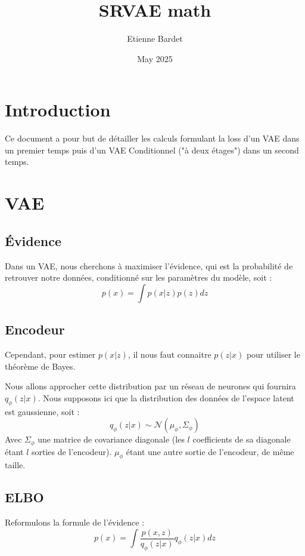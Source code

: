 \documentclass{article}
\title{SRVAE math}
\author{Etienne Bardet}
\date{May 2025}
\begin{document}
\maketitle

\section{Introduction}
Ce document a pour but de détailler les calculs formulant la loss d'un VAE dans un premier temps puis d'un VAE Conditionnel ("à deux étages") dans un second temps.

\section{VAE}\label{vae}
\subsection{Évidence}
Dans un VAE, nous cherchons à maximiser l'évidence, qui est la probabilité de retrouver notre données, conditionné sur les paramètres du modèle, soit :
\begin{equation*}
    p(x) = \int p(x|z) p(z)dz
\end{equation*}

\subsection{Encodeur}

Cependant, pour estimer $p(x|z)$, il nous faut connaitre $p(z|x)$ pour utiliser le théorème de Bayes.

Nous allons approcher cette distribution par un réseau de neurones qui fournira $q_{\phi}(z|x)$.
Nous supposons ici que la distribution des données de l'espace latent est gaussienne, soit :
\begin{equation*}
    q_{\phi}(z|x) \sim \mathcal{N}(\mu_{\phi}, \Sigma_{\phi})
\end{equation*}
Avec $\Sigma_\phi$ une matrice de covariance diagonale (les $l$ coefficients de sa diagonale étant $l$ sorties de l'encodeur). $\mu_\phi$ étant une autre sortie de l'encodeur, de même taille.

\subsection{ELBO}

Reformulons la formule de l'évidence :
\begin{equation*}
    p(x) = \int \frac{p(x,z)}{q_\phi(z|x)}q_\phi(z|x)dz
\end{equation*}
\end{document}
